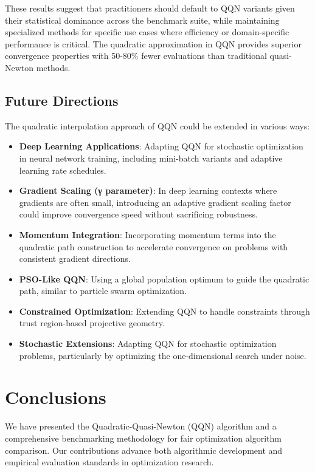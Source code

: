 These results suggest that practitioners should default to QQN variants given their statistical dominance across the benchmark suite, while maintaining specialized methods for specific use cases where efficiency or domain-specific performance is critical. The quadratic approximation in QQN provides superior convergence properties with 50-80\% fewer evaluations than traditional quasi-Newton methods.

\hypertarget{future-directions}{%
\subsection{Future Directions}\label{future-directions}}

The quadratic interpolation approach of QQN could be extended in various ways:

\begin{itemize}
\tightlist
\item
  \textbf{Deep Learning Applications}: Adapting QQN for stochastic optimization in neural network training, including mini-batch variants and adaptive learning rate schedules.
\item
  \textbf{Gradient Scaling (γ parameter)}: In deep learning contexts where gradients are often small, introducing an adaptive gradient scaling factor could improve convergence speed without sacrificing robustness.
\item
  \textbf{Momentum Integration}: Incorporating momentum terms into the quadratic path construction to accelerate convergence on problems with consistent gradient directions.
\item
  \textbf{PSO-Like QQN}: Using a global population optimum to guide the quadratic path, similar to particle swarm optimization.
\item
  \textbf{Constrained Optimization}: Extending QQN to handle constraints through trust region-based projective geometry.
\item
  \textbf{Stochastic Extensions}: Adapting QQN for stochastic optimization problems, particularly by optimizing the one-dimensional search under noise.
\end{itemize}

\hypertarget{conclusions}{%
\section{Conclusions}\label{conclusions}}

We have presented the Quadratic-Quasi-Newton (QQN) algorithm and a comprehensive benchmarking methodology for fair optimization algorithm comparison. Our contributions advance both algorithmic development and empirical evaluation standards in optimization research.

